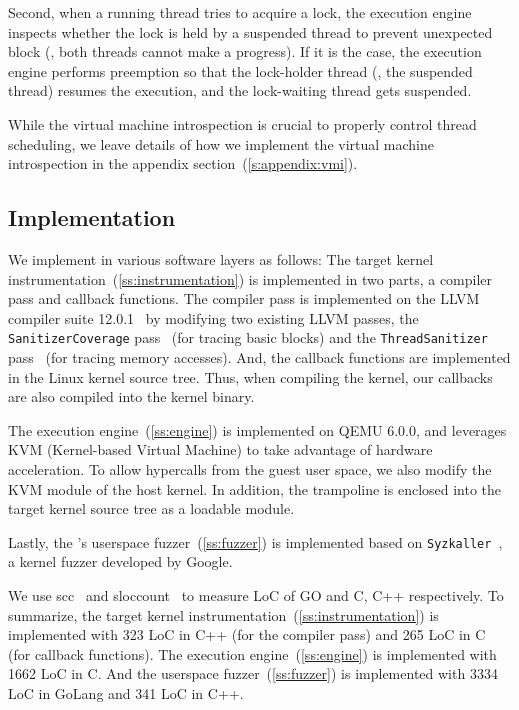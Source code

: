 Second, when a running thread tries to acquire a lock, the execution
engine inspects whether the lock is held by a suspended thread to
prevent unexpected block (\ie, both threads cannot make a progress).
%
If it is the case, the execution engine performs preemption so that
the lock-holder thread (\ie, the suspended thread) resumes the
execution, and the lock-waiting thread gets suspended.


While the virtual machine introspection is crucial to properly control
thread scheduling, we leave details of how we implement the virtual
machine introspection in the appendix
section~(\autoref{s:appendix:vmi}).




\subsection{Implementation}
\label{ss:impl}

We implement \sys in various software layers as follows:
%
The target kernel instrumentation~(\autoref{ss:instrumentation}) is
implemented in two parts, a compiler pass and callback functions. The
compiler pass is implemented on the LLVM compiler suite
12.0.1~\cite{llvm} by modifying two existing LLVM passes, the
\texttt{SanitizerCoverage} pass~\cite{kcovpass} (for tracing basic
blocks) and the \texttt{ThreadSanitizer} pass~\cite{tsanpass} (for
tracing memory accesses).
%
And, the callback functions are implemented in the Linux kernel source
tree.
%
Thus, when compiling the kernel, our callbacks are also compiled into
the kernel binary.


The execution engine~(\autoref{ss:engine}) is implemented on QEMU
6.0.0, and leverages KVM (Kernel-based Virtual Machine) to take
advantage of hardware acceleration.
%
To allow hypercalls from the guest user space, we also modify the KVM
module of the host kernel.
%
In addition, the trampoline is enclosed into the target kernel source
tree as a loadable module.


Lastly, the \sys's userspace fuzzer~(\autoref{ss:fuzzer}) is
implemented based on \texttt{Syzkaller}~\cite{syzkaller}, a kernel
fuzzer developed by Google.



%
We use scc~\cite{scc} and sloccount~\cite{sloccount} to measure LoC of
GO and C, C++ respectively.
%
To summarize, the target kernel
instrumentation~(\autoref{ss:instrumentation}) is implemented with 323
LoC in C++ (for the compiler pass) and 265 LoC in C (for callback
functions).
%
The execution engine~(\autoref{ss:engine}) is implemented with 1662
LoC in C. And the userspace fuzzer~(\autoref{ss:fuzzer}) is
implemented with 3334 LoC in GoLang and 341 LoC in C++.









